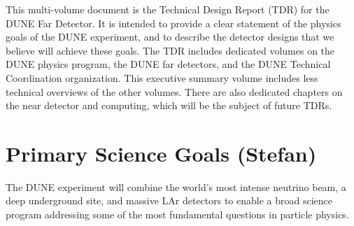 This multi-volume document is the Technical Design Report (TDR) for the DUNE Far Detector. It is intended to provide a clear statement of the physics goals of the DUNE experiment, and to describe the detector designs that we believe will achieve these goals. The TDR includes dedicated volumes on the DUNE physics program, the DUNE far detectors, and the DUNE Technical Coordination organization. This executive summary volume includes less technical overviews of the other volumes. There are also dedicated chapters on the near detector and computing, which will be the subject of future TDRs.

\section{Primary Science Goals (Stefan)}


The DUNE experiment will combine the world's most intense neutrino beam, a deep underground site, and massive LAr detectors to enable a broad science program addressing some of the most fundamental questions in particle physics. 



